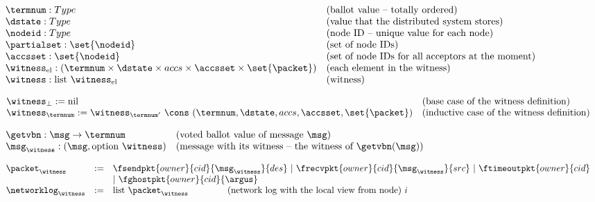 \begin{figure}
\raggedright
{}

$
\begin{array}{llll}
\termnum: Type & \mbox{(ballot value -- totally ordered)} \\
\dstate: Type & \mbox{(value that the distributed system stores)} \\
\nodeid : Type & \mbox{(node ID --  unique value for each node)} & \\
\partialset : \set{\nodeid} & \mbox{(set of node IDs)}\\
\accsset : \set{\nodeid} & \mbox{(set of node IDs for all acceptors at the moment)}\\
\witness_{\mathrm{el}} : (\termnum \times \dstate \times accs  \times \accsset  \times \set{\packet}) & \mbox{(each  element in the witness)}\\
\witness  : \mbox{list}\ \witness_{\mathrm{el}}  & \mbox{(witness)}\\
\end{array}$
\vspace{0.7em}

\vspace{0.2em}

$
\begin{array}{ll}
\witness_{\bot} := \mbox{nil} & \mbox{(base case of the witness definition)}\\
\witness_{\termnum} := \witness_{\termnum'}\ \cons\ (\termnum, \dstate, accs, \accsset, \set{\packet}) &  \mbox{(inductive case of the witness definition)}\\
\end{array}
$
\vspace{0.7em}


\raggedright
{}
\vspace{0.2em}

$
\begin{array}{llll}
\getvbn : \msg \rightarrow \termnum  & \mbox{(voted ballot value of message}\ \msg\mbox{)} \\
\msg_\witness : (\msg, \mbox{option}\ \witness) & \mbox{(message with its witness -- the witness of}\ \getvbn(\msg)\mbox{)}\\
\end{array}
$
\vspace{0.7em}

$
\begin{array}{lll}
\packet_\witness & :=& \fsendpkt{owner}{cid}{\msg_{\witness}}{des}~\vert~\frecvpkt{owner}{cid}{\msg_\witness}{src}~\vert~\ftimeoutpkt{owner}{cid}\\
&&\vert~\fghostpkt{owner}{cid}{\argus}\\
{\networklog}_{\witness} & := & \mbox{list}\ \packet_{\witness}  \ \ \ \ \ \ \ \ \ \ \ \ \ \mbox{(network log with the local view from node)} \  i \\
\end{array}
$
\vspace{0.7em}


\end{figure}
